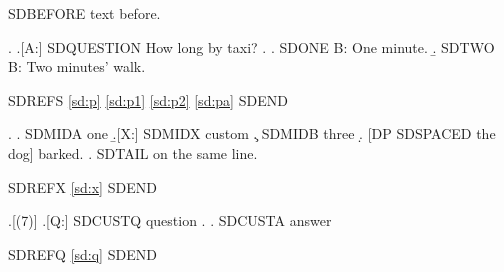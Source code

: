 
\usepackage{hyperref}

SDBEFORE text before.

\ex. \label{sd:p}\a.[A:] \label{sd:pa}SDQUESTION How long by taxi?
\z.
\a. \label{sd:p1}SDONE B: One minute.
\b. \label{sd:p2}SDTWO B: Two minutes' walk.

SDREFS \Last[b] \Last[a] \ref{sd:p} \ref{sd:p1} \ref{sd:p2} \ref{sd:pa} SDEND

\ex. \a. SDMIDA one \b.[X:] \label{sd:x}SDMIDX custom \c. SDMIDB three
\d. [DP SDSPACED the dog] barked. \z. SDTAIL on the same line.

SDREFX \ref{sd:x} SDEND

\ex.[(7)] \a.[Q:] \label{sd:q}SDCUSTQ question \z. \a. SDCUSTA answer

SDREFQ \ref{sd:q} SDEND

